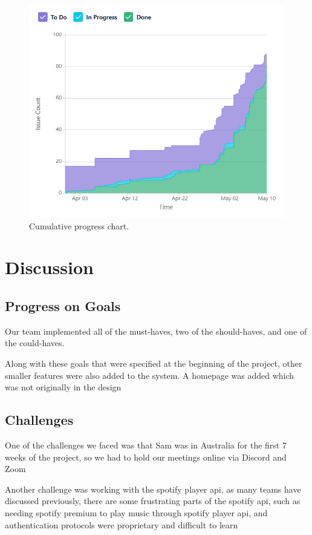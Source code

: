 \documentclass[conference]{IEEEtran}
\begin{document}
\begin{figure}[htbp]
\centerline{\includegraphics[width = \linewidth]{cumulative-flow-diagram.png}}
\caption{Cumulative progress chart.}
\label{progress}
\end{figure}

\section{Discussion}
\subsection{Progress on Goals}
Our team implemented all of the must-haves, two of the should-haves, and one of the could-haves. 

Along with these goals that were specified at the beginning of the project, other smaller features were also added to the system. A homepage was added which was not originally in the design


\subsection{Challenges}
One of the challenges we faced was that Sam was in Australia for the first 7 weeks of the project, so we had to hold our meetings online via Discord and Zoom

Another challenge was working with the spotify player api, as many teams have discussed previously, there are some frustrating parts of the spotify api, such as needing spotify premium to play music through spotify player api, and authentication protocols were proprietary and difficult to learn
\end{document}
